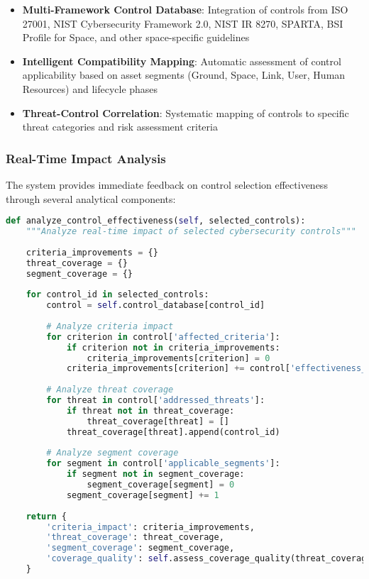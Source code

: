 \documentclass[binding=0.6cm]{sapthesis}
\begin{document}
\begin{itemize}
\item \textbf{Multi-Framework Control Database}: Integration of controls from ISO 27001, NIST Cybersecurity Framework 2.0, NIST IR 8270, SPARTA, BSI Profile for Space, and other space-specific guidelines
\item \textbf{Intelligent Compatibility Mapping}: Automatic assessment of control applicability based on asset segments (Ground, Space, Link, User, Human Resources) and lifecycle phases
\item \textbf{Threat-Control Correlation}: Systematic mapping of controls to specific threat categories and risk assessment criteria
\end{itemize}

\subsubsection{Real-Time Impact Analysis}

The system provides immediate feedback on control selection effectiveness through several analytical components:

\begin{lstlisting}[language=Python, caption=Control Impact Analysis Implementation]
def analyze_control_effectiveness(self, selected_controls):
    """Analyze real-time impact of selected cybersecurity controls"""
    
    criteria_improvements = {}
    threat_coverage = {}
    segment_coverage = {}
    
    for control_id in selected_controls:
        control = self.control_database[control_id]
        
        # Analyze criteria impact
        for criterion in control['affected_criteria']:
            if criterion not in criteria_improvements:
                criteria_improvements[criterion] = 0
            criteria_improvements[criterion] += control['effectiveness_score']
        
        # Analyze threat coverage
        for threat in control['addressed_threats']:
            if threat not in threat_coverage:
                threat_coverage[threat] = []
            threat_coverage[threat].append(control_id)
        
        # Analyze segment coverage
        for segment in control['applicable_segments']:
            if segment not in segment_coverage:
                segment_coverage[segment] = 0
            segment_coverage[segment] += 1
    
    return {
        'criteria_impact': criteria_improvements,
        'threat_coverage': threat_coverage,
        'segment_coverage': segment_coverage,
        'coverage_quality': self.assess_coverage_quality(threat_coverage)
    }
\end{lstlisting}
\end{document}
